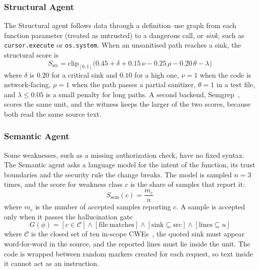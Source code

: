 \documentclass[conference]{IEEEtran}
\begin{document}
\subsubsection{Structural Agent}
The Structural agent follows data through a definition--use graph from
each function parameter (treated as untrusted) to a dangerous call, or
\emph{sink}, such as \texttt{cursor.execute} or \texttt{os.system}. When an
unsanitised path reaches a sink, the structural score is
\begin{equation}
S_{\mathrm{str}}=\mathrm{clip}_{[0,1]}\bigl(0.45+\delta+0.15\,\nu-0.25\,\rho-0.20\,\theta-\lambda\bigr)
\label{eq:str}
\end{equation}
where $\delta$ is $0.20$ for a critical sink and $0.10$ for a high one,
$\nu=1$ when the code is network-facing, $\rho=1$ when the path passes a
partial sanitizer, $\theta=1$ in a test file, and $\lambda\le0.05$ is a
small penalty for long paths. A second backend, Semgrep~\cite{semgrep},
scores the same unit, and the witness keeps the larger of the two scores,
because both read the same source text.

\subsubsection{Semantic Agent}
Some weaknesses, such as a missing authorization check, have no fixed
syntax. The Semantic agent asks a language model for the intent of the
function, its trust boundaries and the security rule the change breaks.
The model is sampled $n=3$ times, and the score for weakness class $c$ is
the share of samples that report it:
\begin{equation}
S_{\mathrm{sem}}(c)=\frac{m_c}{n}
\label{eq:sem}
\end{equation}
where $m_c$ is the number of accepted samples reporting $c$. A sample is
accepted only when it passes the hallucination gate
\begin{equation}
G(\phi)=[c\in\mathcal{C}]\wedge[\mathrm{file}\ \text{matches}]\wedge[\mathrm{sink}\subseteq\mathrm{src}]\wedge[\mathrm{lines}\subseteq u]
\label{eq:gate}
\end{equation}
where $\mathcal{C}$ is the closed set of ten in-scope CWEs~\cite{cwe}, the
quoted sink must appear word-for-word in the source, and the reported
lines must lie inside the unit. The code is wrapped between random markers
created for each request, so text inside it cannot act as an instruction.
\end{document}
